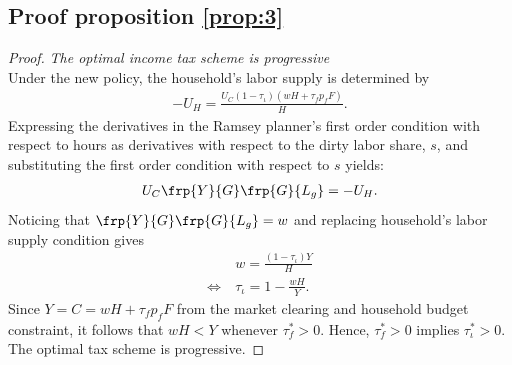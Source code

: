 \subsection{Proof proposition \ref{prop:3}}
\begin{proof} \textit{The optimal income tax scheme is progressive}\\ %
	Under the new policy, the household's labor supply is determined by
	\begin{align}
	-U_H=\frac{U_C (1-\tau_{\iota})(wH+\tau_f p_fF)}{H}.
	\end{align}
	Expressing the derivatives in the Ramsey planner's first order condition with respect to hours as derivatives with respect to the dirty labor share, $s$, and substituting the first order condition with respect to $s$ yields:
	\begin{align}
	U_C \frp{Y}{G}\frp{G}{L_g}=-U_H.
	\end{align}
	Noticing that $\frp{Y}{G}\frp{G}{L_g}=w$ and replacing household's labor supply condition gives
	\begin{align}
	& w=\frac{(1-\tau_\iota)Y}{H}\\
	\Leftrightarrow\ & \tau_\iota=1-\frac{wH}{Y}. 
	\end{align} 
	Since $Y=C=wH+\tau_fp_fF$ from the market clearing and household budget constraint, it follows that $wH<Y$ whenever $\tau^*_f>0$. Hence, $\tau_f^*>0$ implies $\tau^*_{\iota}>0$.
	The optimal tax scheme is progressive.
\end{proof}


